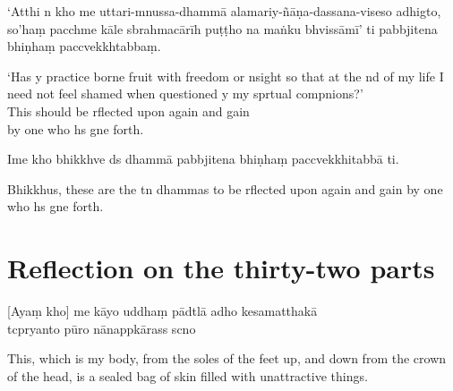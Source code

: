 `Atthi n kho me uttari-mnussa-dhammā alamariy-ñāṇa-dassana-viseso adhigto, so'haṃ pacchme kāle sbrahmacārīh puṭṭho na maṅku bhvissāmī' ti pabbjitena bhiṇhaṃ paccvekkhtabbaṃ.

\begin{english}
  `Has y practice borne fruit with freedom or nsight so that at the nd of my life I need not feel shamed when questioned y my sprtual compnions?'\\
  This should be rflected upon again and gain\\
  by one who hs gne forth.
\end{english}

Ime kho bhikkhve ds dhammā pabbjitena bhiṇhaṃ paccvekkhitabbā ti.

\begin{english}
  Bhikkhus, these are the tn dhammas to be rflected upon again and gain by one who hs gne forth.
\end{english}

\clearpage

\chapter[Thirty-two parts]{Reflection on the thirty-two parts}%

\begin{leader}
\end{leader}

[Ayaṃ kho] me kāyo uddhaṃ pādtlā adho kesamatthakā\\
tcpryanto pūro nānappkārass scno

\begin{english}
  This, which is my body, from the soles of the feet up, and down from the crown of the head, is a sealed bag of skin filled with unattractive things.
\end{english}

